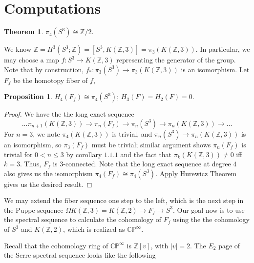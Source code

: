 \documentclass{article}
\theoremstyle{definition}
\newtheorem{theorem}{Theorem}[section]
\theoremstyle{definition}
\theoremstyle{definition}
\newtheorem{proposition}{Proposition}[section]
\theoremstyle{definition}
\theoremstyle{definition}
\theoremstyle{definition}
\theoremstyle{definition}
\begin{document}
\section{Computations}

\begin{tcolorbox}[colback=red!5!white,colframe=red!30!white]
\begin{theorem}
    $\pi_4(S^3)\cong \mathbb{Z}/2$.
\end{theorem}
\end{tcolorbox}
We know $\mathbb{Z}=H^3(S^3;\mathbb{Z})=[S^3,K(\mathbb{Z},3)]=\pi_3(K(\mathbb{Z},3))$. In particular, we may choose a map $f: S^3\to K(\mathbb{Z},3)$ representing the generator of the group. Note that by construction, $f_*: \pi_3(S^3)\to \pi_3(K(\mathbb{Z},3))$ is an isomorphism. Let $F_f$ be the homotopy fiber of $f$,

\begin{tcolorbox}[colback=blue!5!white,colframe=blue!30!white]
\begin{proposition}
$H_4(F_f)\cong \pi_4(S^3)$; $H_3(F)=H_2(F)=0$.
\end{proposition}
\end{tcolorbox}

\begin{proof}
We have the the long exact sequence 
\[ ...\pi_{n+1}(K(\mathbb{Z},3))\to\pi_n(F_f)\to \pi_n(S^3)\to \pi_n(K(\mathbb{Z},3))\to...\]
For $n=3$, we note $\pi_{4}(K(\mathbb{Z},3))$ is trivial, and $\pi_n(S^3)\to \pi_n(K(\mathbb{Z},3))$ is an isomorphism, so $\pi_3(F_f)$ must be trivial; similar argument shows $\pi_n(F_f)$ is trivial for $0<n\leq 3$ by corollary $1.1.1$ and the fact that $\pi_k(K(\mathbb{Z},3))\neq 0$ iff $k=3$. Thus, $F_f$ is $3$-connected. Note that the long exact sequence at degree $4$ also gives us the isomorphism $\pi_4(F_f)\cong \pi_4(S^3)$. Apply Hurewicz Theorem gives us the desired result.
\end{proof}

We may extend the fiber sequence one step to the left, which is the next step in the Puppe sequence $\Omega K(\mathbb{Z},3)=K(\mathbb{Z},2)\to F_f\to S^3$. Our goal now is to use the spectral sequence to calculate the cohomology of $F_f$ using the the cohomology of $S^3$ and $K(\mathbb{Z},2)$, which is realized as $\mathbb{CP}^{\infty}$. 

Recall that the cohomology ring of $\mathbb{CP}^{\infty}$ is $\mathbb{Z}[v]$, with $|v|=2$. The $E_2$ page of the Serre spectral sequence looks like the following 
\end{document}

